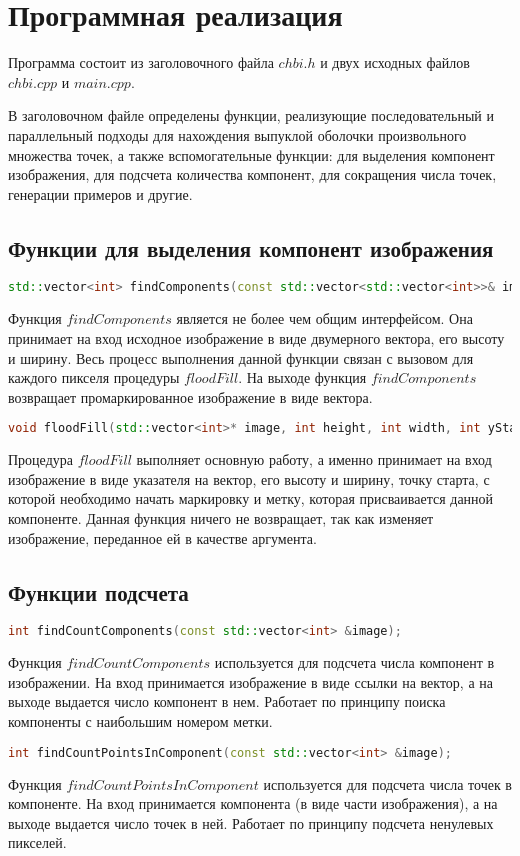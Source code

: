 \documentclass[a4paper, 12pt]{extarticle}
\newcommand{\n}{\par}
\begin{document}
	\section{Программная реализация}
	Программа состоит из заголовочного файла $chbi.h$ и двух исходных файлов $chbi.cpp$ и $main.cpp$.\n
	В заголовочном файле определены функции, реализующие последовательный и параллельный подходы для нахождения выпуклой оболочки произвольного множества точек, а также вспомогательные функции: для выделения компонент изображения, для подсчета количества компонент, для сокращения числа точек, генерации примеров и другие.
	
	\subsection{Функции для выделения компонент изображения}
	\begin{lstlisting}[language=C++]
		std::vector<int> findComponents(const std::vector<std::vector<int>>& image, int width, int height);
	\end{lstlisting}
	Функция $findComponents$ является не более чем общим интерфейсом. Она принимает на вход исходное изображение в виде двумерного вектора, его высоту и ширину. Весь процесс выполнения данной функции связан с вызовом для каждого пикселя процедуры $floodFill$. На выходе функция $findComponents$ возвращает промаркированное изображение в виде вектора.
	\begin{lstlisting}[language=C++]
		void floodFill(std::vector<int>* image, int height, int width, int yStart, int xStart, int label);
	\end{lstlisting}
	Процедура $floodFill$ выполняет основную работу, а именно принимает на вход изображение в виде указателя на вектор, его высоту и ширину, точку старта, с которой необходимо начать маркировку и метку, которая присваивается данной компоненте. Данная функция ничего не возвращает, так как изменяет изображение, переданное ей в качестве аргумента.
	
	\subsection{Функции подсчета}
	\begin{lstlisting}[language=C++]
		int findCountComponents(const std::vector<int> &image);
	\end{lstlisting}
	Функция $findCountComponents$ используется для подсчета числа компонент в изображении. На вход принимается изображение в виде ссылки на вектор, а на выходе выдается число компонент в нем. Работает по принципу поиска компоненты с наибольшим номером метки.
	\begin{lstlisting}[language=C++]
		int findCountPointsInComponent(const std::vector<int> &image);
	\end{lstlisting}
	Функция $findCountPointsInComponent$ используется для подсчета числа точек в компоненте. На вход принимается компонента (в виде части изображения), а на выходе выдается число точек в ней. Работает по принципу подсчета ненулевых пикселей.
	
\end{document}
